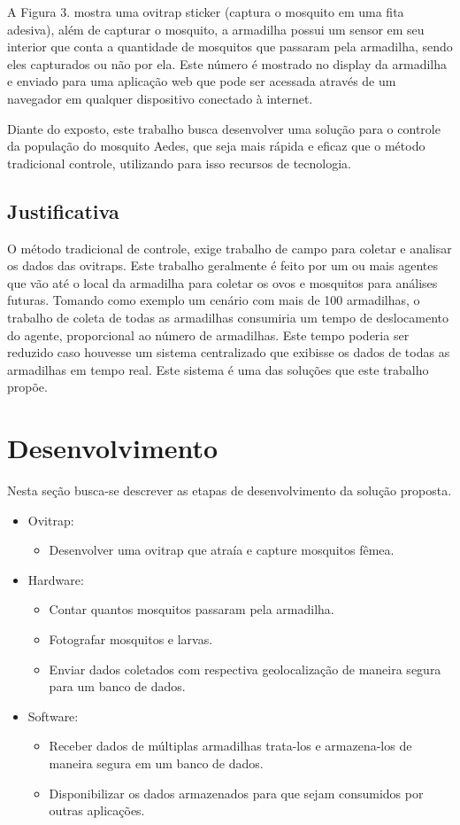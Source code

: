 \documentclass[
	12pt,				%
	openright,			%
	oneside,			%
	a4paper,			%
	chapter=TITLE,		%
	english,			%
	brazil				%
	]{abntex2}
\begin{document}
A Figura 3. mostra uma ovitrap sticker (captura o mosquito em uma fita adesiva),
além de capturar o mosquito, a armadilha possui um sensor em seu interior que conta a
quantidade de mosquitos que passaram pela armadilha, sendo eles capturados ou não por
ela. Este número é mostrado no display da armadilha e enviado para uma aplicação web
que pode ser acessada através de um navegador em qualquer dispositivo conectado à
internet.

Diante do exposto, este trabalho busca desenvolver uma solução para o controle da
população do mosquito Aedes, que seja mais rápida e eficaz que o método tradicional
controle, utilizando para isso recursos de tecnologia.

\section{Justificativa}

O método tradicional de controle, exige trabalho de campo para coletar e analisar os dados
das ovitraps. Este trabalho geralmente é feito por um ou mais agentes que vão até o local
da armadilha para coletar os ovos e mosquitos para análises futuras. Tomando como
exemplo um cenário com mais de 100 armadilhas, o trabalho de coleta de todas as
armadilhas consumiria um tempo de deslocamento do agente, proporcional ao número de
armadilhas. Este tempo poderia ser reduzido caso houvesse um sistema centralizado que
exibisse os dados de todas as armadilhas em tempo real. Este sistema é uma das soluções
que este trabalho propõe.

\chapter{Desenvolvimento}
Nesta seção busca-se descrever as etapas de desenvolvimento da solução proposta.

\begin{itemize}
    \item Ovitrap:
        \begin{itemize}
        \item Desenvolver uma ovitrap que atraía e capture mosquitos fêmea.
        \end{itemize}
    \item Hardware:
        \begin{itemize}
        \item Contar quantos mosquitos passaram pela armadilha.
        \item Fotografar mosquitos e larvas.
        \item Enviar dados coletados com respectiva geolocalização de maneira segura para um banco de dados.
        \end{itemize}
    \item Software:
        \begin{itemize}
        \item Receber dados de múltiplas armadilhas trata-los e armazena-los de maneira segura em um banco de dados.
        \item Disponibilizar os dados armazenados para que sejam consumidos por outras aplicações.
        \end{itemize}
\end{itemize}
\end{document}
